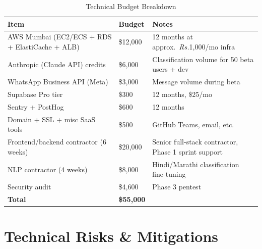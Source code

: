 \documentclass[12pt, a4paper]{article}
\begin{document}
\begin{table}[ht]
\centering
\caption{Technical Budget Breakdown}
\renewcommand{\arraystretch}{1.3}
\begin{tabularx}{\textwidth}{X p{2cm} p{4cm}}
\toprule
\rowcolor{pollitylightblue}
\textbf{Item} & \textbf{Budget} & \textbf{Notes} \\
\midrule
AWS Mumbai (EC2/ECS + RDS + ElastiCache + ALB) & \$12,000 & 12 months at approx.\ \textit{Rs.}1,000/mo infra \\
Anthropic (Claude API) credits                 & \$6,000  & Classification volume for 50 beta users + dev \\
WhatsApp Business API (Meta)                   & \$3,000  & Message volume during beta \\
Supabase Pro tier                              & \$300    & 12 months, \$25/mo \\
Sentry + PostHog                               & \$600    & 12 months \\
Domain + SSL + misc SaaS tools                 & \$500    & GitHub Teams, email, etc. \\
Frontend/backend contractor (6 weeks)          & \$20,000 & Senior full-stack contractor, Phase 1 sprint support \\
NLP contractor (4 weeks)                       & \$8,000  & Hindi/Marathi classification fine-tuning \\
Security audit                                 & \$4,600  & Phase 3 pentest \\
\midrule
\textbf{Total}                                 & \textbf{\$55,000} & \\
\bottomrule
\end{tabularx}
\end{table}

\newpage

\section{Technical Risks \& Mitigations}
\end{document}
